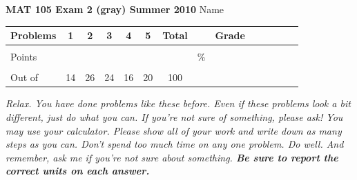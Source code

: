 \documentclass[12pt]{article}
\begin{document}
\textbf{MAT 105 Exam 2 (gray) Summer 2010} \hspace{.4in} {\large Name} \hrulefill

\begin{center}

\begin{tabular}
{|l|c|c|c|c|c|c|c|c|c|c|c|c|c|} \hline

 Problems & \hspace{5 pt} 1 \hspace{5 pt}  & \hspace{5 pt} 2 \hspace{5 pt} & \hspace{5 pt} 3  \hspace{5 pt} & \hspace{5 pt} 4  \hspace{5 pt} & \hspace{5 pt}5 \hspace{5 pt} & \hspace{5 pt} Total  \hspace{5 pt} & &  \hspace{5 pt} Grade \hspace{5 pt}  \\ \hline
&&&&&&&&\\  
Points &&&&&&&    \hspace{.8in}\% &  \\ 
&&&&&&&& \\  \hline
Out of & 14 & 26 & 24  & 16 & 20 &100 & & \\ \hline

\end {tabular}

\end{center}

\vspace{.2in}

 \emph{Relax.  You have done problems like these before.  Even if these problems look a bit different, just do what you can.  If you're not sure of something, please ask! You may use your calculator.  Please show all of your work and write down as many steps as you can.  Don't spend too much time on any one problem.  Do well.  And remember, ask me if you're not sure about something. \textbf{Be sure to report the correct units on each answer.}}

\hrulefill
\end{document}
